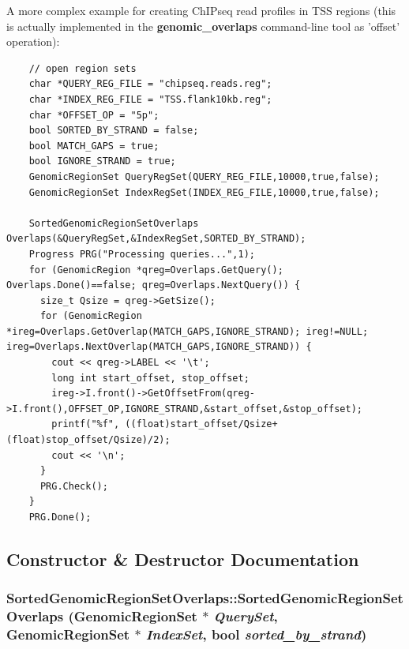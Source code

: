  A more complex example for creating ChIPseq read profiles in TSS regions (this is actually implemented in the {\bf genomic\_\-overlaps} command-line tool as 'offset' operation): 

\begin{Code}\begin{verbatim}    // open region sets
    char *QUERY_REG_FILE = "chipseq.reads.reg";
    char *INDEX_REG_FILE = "TSS.flank10kb.reg";
    char *OFFSET_OP = "5p";
    bool SORTED_BY_STRAND = false; 
    bool MATCH_GAPS = true;
    bool IGNORE_STRAND = true;
    GenomicRegionSet QueryRegSet(QUERY_REG_FILE,10000,true,false);
    GenomicRegionSet IndexRegSet(INDEX_REG_FILE,10000,true,false);

    SortedGenomicRegionSetOverlaps Overlaps(&QueryRegSet,&IndexRegSet,SORTED_BY_STRAND);
    Progress PRG("Processing queries...",1);
    for (GenomicRegion *qreg=Overlaps.GetQuery(); Overlaps.Done()==false; qreg=Overlaps.NextQuery()) {
      size_t Qsize = qreg->GetSize();
      for (GenomicRegion *ireg=Overlaps.GetOverlap(MATCH_GAPS,IGNORE_STRAND); ireg!=NULL; ireg=Overlaps.NextOverlap(MATCH_GAPS,IGNORE_STRAND)) {
        cout << qreg->LABEL << '\t';
        long int start_offset, stop_offset;
        ireg->I.front()->GetOffsetFrom(qreg->I.front(),OFFSET_OP,IGNORE_STRAND,&start_offset,&stop_offset);
        printf("%f", ((float)start_offset/Qsize+(float)stop_offset/Qsize)/2); 
        cout << '\n';
      }
      PRG.Check();
    }
    PRG.Done();
\end{verbatim}
\end{Code}

 

\subsection{Constructor \& Destructor Documentation}
\hypertarget{classSortedGenomicRegionSetOverlaps_0213f6ea908db759f63cea80db4909aa}{
\subsubsection[SortedGenomicRegionSetOverlaps]{\setlength{\rightskip}{0pt plus 5cm}SortedGenomicRegionSetOverlaps::SortedGenomicRegionSetOverlaps ({\bf GenomicRegionSet} $\ast$ {\em QuerySet}, \/  {\bf GenomicRegionSet} $\ast$ {\em IndexSet}, \/  bool {\em sorted\_\-by\_\-strand})}}
\label{classSortedGenomicRegionSetOverlaps_0213f6ea908db759f63cea80db4909aa}


